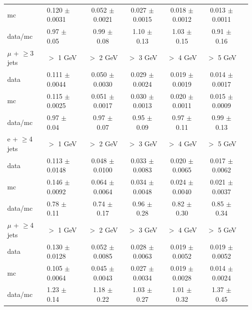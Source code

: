 \begin{table}[!ht]
\begin{center}
\begin{tabular}{l|l|c|c|c|c|c}
        mc   &  0.120 $\pm$ 0.0031   &  0.052 $\pm$ 0.0021   &  0.027 $\pm$ 0.0015   &  0.018 $\pm$ 0.0012   &  0.013 $\pm$ 0.0011  \\
   data/mc   &     0.97 $\pm$ 0.05   &     0.99 $\pm$ 0.08   &     1.10 $\pm$ 0.13   &     1.03 $\pm$ 0.15   &     0.91 $\pm$ 0.16  \\
\hline
\hline
 $\mu$ + $\geq$3 jets            &           $>$ 1 GeV   &           $>$ 2 GeV   &           $>$ 3 GeV   &           $>$ 4 GeV   &           $>$ 5 GeV  \\
\hline
      data   &  0.111 $\pm$ 0.0044   &  0.050 $\pm$ 0.0030   &  0.029 $\pm$ 0.0024   &  0.019 $\pm$ 0.0019   &  0.014 $\pm$ 0.0017  \\
        mc   &  0.115 $\pm$ 0.0025   &  0.051 $\pm$ 0.0017   &  0.030 $\pm$ 0.0013   &  0.020 $\pm$ 0.0011   &  0.015 $\pm$ 0.0009  \\
   data/mc   &     0.97 $\pm$ 0.04   &     0.97 $\pm$ 0.07   &     0.95 $\pm$ 0.09   &     0.97 $\pm$ 0.11   &     0.99 $\pm$ 0.13  \\
\hline
\hline
 e + $\geq$4 jets            &           $>$ 1 GeV   &           $>$ 2 GeV   &           $>$ 3 GeV   &           $>$ 4 GeV   &           $>$ 5 GeV  \\
\hline
      data   &  0.113 $\pm$ 0.0148   &  0.048 $\pm$ 0.0100   &  0.033 $\pm$ 0.0083   &  0.020 $\pm$ 0.0065   &  0.017 $\pm$ 0.0062  \\
        mc   &  0.146 $\pm$ 0.0092   &  0.064 $\pm$ 0.0064   &  0.034 $\pm$ 0.0048   &  0.024 $\pm$ 0.0040   &  0.021 $\pm$ 0.0037  \\
   data/mc   &     0.78 $\pm$ 0.11   &     0.74 $\pm$ 0.17   &     0.96 $\pm$ 0.28   &     0.82 $\pm$ 0.30   &     0.85 $\pm$ 0.34  \\
\hline
\hline
 $\mu$ + $\geq$4 jets            &           $>$ 1 GeV   &           $>$ 2 GeV   &           $>$ 3 GeV   &           $>$ 4 GeV   &           $>$ 5 GeV  \\
\hline
      data   &  0.130 $\pm$ 0.0128   &  0.052 $\pm$ 0.0085   &  0.028 $\pm$ 0.0063   &  0.019 $\pm$ 0.0052   &  0.019 $\pm$ 0.0052  \\
        mc   &  0.105 $\pm$ 0.0064   &  0.045 $\pm$ 0.0043   &  0.027 $\pm$ 0.0034   &  0.019 $\pm$ 0.0028   &  0.014 $\pm$ 0.0024  \\
   data/mc   &     1.23 $\pm$ 0.14   &     1.18 $\pm$ 0.22   &     1.03 $\pm$ 0.27   &     1.01 $\pm$ 0.32   &     1.37 $\pm$ 0.45  \\
\hline
\hline

\end{tabular}
\end{center}
\end{table}



